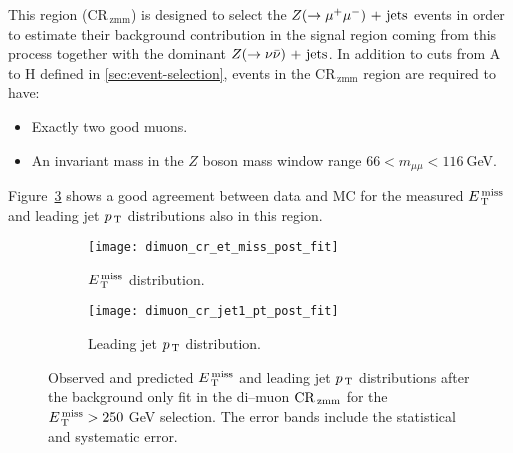 This region (CR$_\mathrm{\, zmm}$) is designed to select the $Z (\rightarrow \mu^+ \mu^-)\mathrm{~+~jets}$
events in order to estimate their background contribution in the signal region
coming from this process together with the dominant $Z (\rightarrow \nu \bar{\nu})\mathrm{~+~jets}$. In
addition to cuts from A to H defined in \cref{sec:event-selection}, events in
the CR$_\mathrm{\, zmm}$ region are required to have:
\begin{itemize}
\item Exactly two good muons.
\item An invariant mass in the $Z$ boson mass window range
  $66 < m_{\mu \mu} < 116~$GeV.
\end{itemize}
Figure~\ref{fig:dimuon_cr_plots} shows a good agreement between data and MC for
the measured $E_\mathrm{\, T}^\mathrm{\, miss}$ and leading jet $p_\mathrm{\, T}$ distributions also in this region.
\begin{figure}[!h]
  \centering
  \begin{subfigure}[t]{.48\linewidth}
    \texttt{[image: dimuon\_cr\_et\_miss\_post\_fit]}
    \caption{$E_\mathrm{\, T}^\mathrm{\, miss}$ distribution.}
    \label{fig:dimuon_cr_et_miss_pre_fit}
  \end{subfigure}
  \begin{subfigure}[t]{.48\linewidth}
    \texttt{[image: dimuon\_cr\_jet1\_pt\_post\_fit]}
    \caption{Leading jet $p_\mathrm{\, T}$ distribution.}
    \label{fig:dimuon_cr_jet1_pt_pre_fit}
  \end{subfigure}
  \caption{Observed and predicted $E_\mathrm{\, T}^\mathrm{\, miss}$ and leading jet $p_\mathrm{\, T}$ distributions
    after the background only fit in the di--muon $\mathrm{CR}_\mathrm{\, zmm}$ for the
    $E_\mathrm{\, T}^\mathrm{\, miss} > 250~$GeV selection. The error bands include the statistical and
    systematic error.}
  \label{fig:dimuon_cr_plots}
\end{figure}
